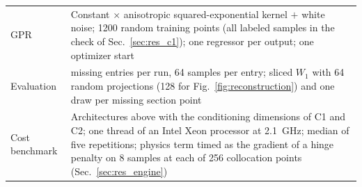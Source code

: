 \begin{table}[tb]
\begin{ruledtabular}
\begin{tabular}{>{\raggedright\arraybackslash}p{}>{\raggedright\arraybackslash}p{}}
GPR & Constant $\times$ anisotropic squared-exponential kernel $+$ white noise; 1200 random training points (all labeled samples in the check of Sec.~\ref{sec:res_c1}); one regressor per output; one optimizer start\\
Evaluation & 1500 missing entries per run, 64 samples per entry; sliced $W_1$ with 64 random projections (128 for Fig.~\ref{fig:reconstruction}) and one draw per missing section point\\
Cost benchmark & Architectures above with the conditioning dimensions of C1 and C2; one thread of an Intel Xeon processor at 2.1~GHz; median of five repetitions; physics term timed as the gradient of a hinge penalty on 8 samples at each of 256 collocation points (Sec.~\ref{sec:res_engine})\\
\end{tabular}
\end{ruledtabular}
\end{table}
